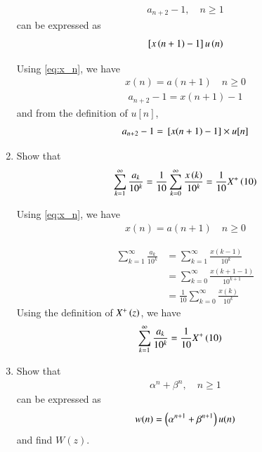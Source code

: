 \documentclass[journal,12pt,twocolumn]{IEEEtran}
\renewcommand\thesection{\arabic{section}}
\begin{document}
\begin{enumerate}[label=\thesection.\arabic*,ref=\thesection.\theenumi]
\begin{align}
a_{n+2}-1, \quad n \ge 1
\end{align}
can be expressed as 
\begin{align}
	{}\left[x\left(n+1\right)-1\right]u\left(n\right)
\end{align}

\solution 

Using \eqref{eq:x_n}, we have
\begin{align} 
	x(n) = a(n+1) \quad n \ge 0
\end{align}
\begin{align}
    a_{n+2} - 1 = x(n + 1) - 1
\end{align}
and from the definition of $u[n]$,
\begin{align}
    a_{n+2} - 1 = {}\left[x(n + 1) - 1\right] \times u[n]
\end{align}

\item Show that 
\begin{align}
	\sum_{k=1}^{\infty}\frac{a_k}{10^k}= 
	\frac{1}{10}\sum_{k=0}^{\infty}\frac{x\left(k\right)}{10^k} =\frac{1}{10}X^{+}\left({10}\right)
\end{align}

\solution
Using \eqref{eq:x_n}, we have
\begin{align}
	x(n) = a(n+1) \quad n \ge 0
	\label{eq:xn_an}
\end{align}

\begin{align}
	\sum_{k=1}^{\infty}\frac{a_k}{10^k} &= \sum_{k=1}^{\infty}\frac{x(k-1)}{10^k} \\
	&= \sum_{k=0}^{\infty}\frac{x(k + 1 - 1)}{10^{k+1}} \\
	&= \frac{1}{10}\sum_{k=0}^{\infty}\frac{x(k)}{10^k} 
\end{align}
Using the definition of $X^{+}\left(z\right)$, we have
\begin{align}
	\sum_{k=1}^{\infty}\frac{a_k}{10^k} &= \frac{1}{10}X^{+}\left({10}\right)
	\label{eq:ak_10}
\end{align}

\item Show that 
\begin{align}
	\alpha^n + \beta^n, \quad n \ge 1
\end{align}
can be expressed as 
\begin{align}
	w(n) =\left(\alpha^{n+1} + \beta^{n+1}\right)u(n)
\end{align}
		and find $W(z)$.


\end{enumerate}
\end{document}
